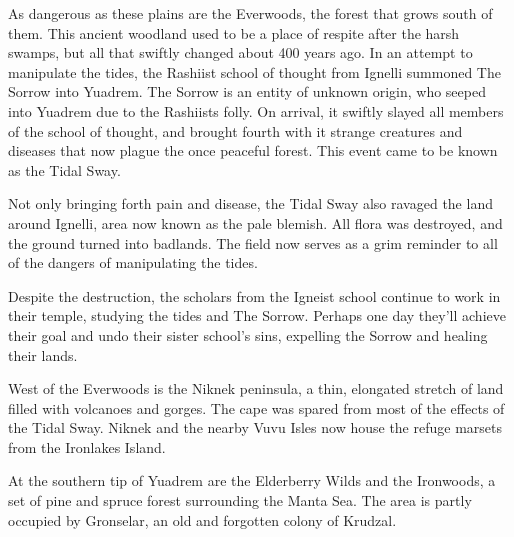 As dangerous as these plains are the Everwoods, the forest that grows south of them.
This ancient woodland used to be a place of respite after the harsh swamps, but all that swiftly changed about 400 years ago.
In an attempt to manipulate the tides, the Rashiist school of thought from Ignelli summoned The Sorrow into Yuadrem.
The Sorrow is an entity of unknown origin, who seeped into Yuadrem due to the Rashiists folly.
On arrival, it swiftly slayed all members of the school of thought, and brought fourth with it strange creatures and diseases that now plague the once peaceful forest.
This event came to be known as the Tidal Sway.

Not only bringing forth pain and disease, the Tidal Sway also ravaged the land around Ignelli, area now known as the pale blemish.
All flora was destroyed, and the ground turned into badlands.
The field now serves as a grim reminder to all of the dangers of manipulating the tides.

Despite the destruction, the scholars from the Igneist school continue to work in their temple, studying the tides and The Sorrow.
Perhaps one day they'll achieve their goal and undo their sister school's sins, expelling the Sorrow and healing their lands.

West of the Everwoods is the Niknek peninsula, a thin, elongated stretch of land filled with volcanoes and gorges.
The cape was spared from most of the effects of the Tidal Sway.
Niknek and the nearby Vuvu Isles now house the refuge marsets from the Ironlakes Island.

At the southern tip of Yuadrem are the Elderberry Wilds and the Ironwoods, a set of pine and spruce forest surrounding the Manta Sea.
The area is partly occupied by Gronselar, an old and forgotten colony of Krudzal.
